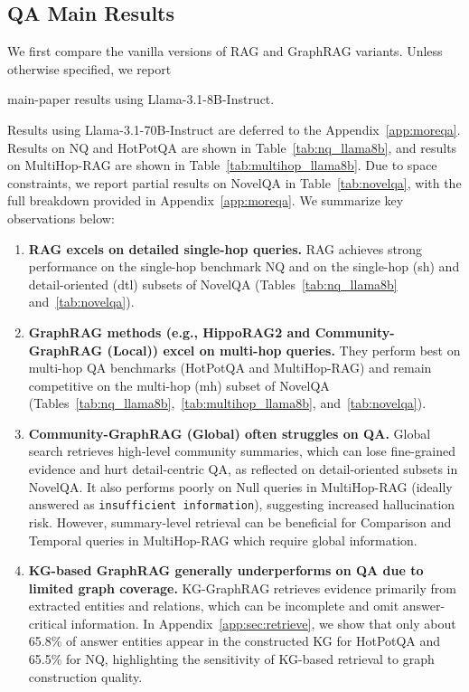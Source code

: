 \subsection{QA Main Results}
\label{sec:qa_result}
We first compare the vanilla versions of RAG and GraphRAG variants. 
Unless otherwise specified, we report {main-paper results using Llama-3.1-8B-Instruct. {Results using Llama-3.1-70B-Instruct are deferred to the Appendix~\ref{app:moreqa}.
Results on NQ and HotPotQA are shown in Table~\ref{tab:nq_llama8b}, and results on MultiHop-RAG are shown in Table~\ref{tab:multihop_llama8b}. 
Due to space constraints, we report partial results on NovelQA in Table~\ref{tab:novelqa}, with the full breakdown provided in Appendix~\ref{app:moreqa}.
We summarize key observations below:
\begin{enumerate}[leftmargin=*, itemsep=0pt, parsep=0pt]
    \item \textbf{RAG excels on detailed single-hop queries.} 
    RAG achieves strong performance on the single-hop benchmark NQ and on the single-hop (sh) and detail-oriented (dtl) subsets of NovelQA (Tables~\ref{tab:nq_llama8b} and~\ref{tab:novelqa}).
    \item \textbf{GraphRAG methods (e.g., HippoRAG2 and Community-GraphRAG (Local)) excel on multi-hop queries.} 
    They perform best on multi-hop QA benchmarks (HotPotQA and MultiHop-RAG) and remain competitive on the multi-hop (mh) subset of NovelQA (Tables~\ref{tab:nq_llama8b},~\ref{tab:multihop_llama8b}, and~\ref{tab:novelqa}).
    \item \textbf{Community-GraphRAG (Global) often struggles on QA.} 
    Global search retrieves high-level community summaries, which can lose fine-grained evidence and hurt detail-centric QA, as reflected on detail-oriented subsets in NovelQA. It also performs poorly on Null queries in MultiHop-RAG (ideally answered as \texttt{insufficient information}), suggesting increased hallucination risk. However, summary-level retrieval can be beneficial for Comparison and Temporal queries in MultiHop-RAG which require global information.
    
    \item \textbf{KG-based GraphRAG generally underperforms on QA due to limited graph coverage.} 
    KG-GraphRAG retrieves evidence primarily from extracted entities and relations, which can be incomplete and omit answer-critical information. In Appendix~\ref{app:sec:retrieve}, we show that only about 65.8\% of answer entities appear in the constructed KG for HotPotQA and 65.5\% for NQ, highlighting the sensitivity of KG-based retrieval to graph construction quality.
    

\end{enumerate}}}

